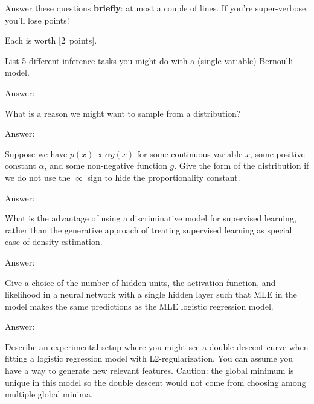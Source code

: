 \documentclass{article}
\newenvironment{answer}{\par\begingroup\color{answer}Answer: }{\endgroup}
\newcommand{\pts}[1]{\textcolor{points}{[#1~points]}}
\newcommand{\TODO}{\color{red}{TODO}}
\begin{document}
Answer these questions \textbf{briefly}: at most a couple of lines. If you're super-verbose, you'll lose points!

Each is worth \pts{2}.

\begin{qlist}


\item List 5 different inference tasks you might do with a (single variable) Bernoulli model.

\begin{answer}\TODO\end{answer}


\item What is a reason we might want to sample from a distribution?

\begin{answer}\TODO\end{answer}


\item
    Suppose we have $p(x) \propto \alpha g(x)$ for some continuous variable $x$, some positive constant $\alpha$, and some non-negative function $g$.
    Give the form of the distribution if we do not use the $\propto$ sign to hide the proportionality constant.
\begin{answer}\TODO\end{answer}


\item What is the advantage of using a discriminative model for supervised learning, rather than the generative approach of treating supervised learning as special case of density estimation.

\begin{answer}\TODO\end{answer}


\item Give a choice of the number of hidden units, the activation function, and likelihood in a neural network with a single hidden layer such that MLE in the model makes the same predictions as the MLE logistic regression model.

\begin{answer}\TODO\end{answer}


\item Describe an experimental setup where you might see a double descent curve when fitting a logistic regression model with L2-regularization. You can assume you have a way to generate new relevant features. Caution: the global minimum is unique in this model so the double descent would not come from choosing among multiple global minima.


\end{qlist}
\end{document}

